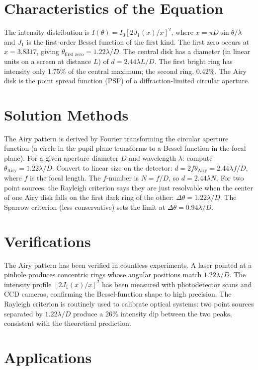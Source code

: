 \section*{Characteristics of the Equation}

The intensity distribution is $I(\theta) = I_0\left[2J_1(x)/x\right]^2$, where $x = \pi D\sin\theta/\lambda$ and $J_1$ is the first-order Bessel function of the first kind. The first zero occurs at $x = 3.8317$, giving $\theta_{\text{first zero}} = 1.22\lambda/D$. The central disk has a diameter (in linear units on a screen at distance $L$) of $d = 2.44\lambda L/D$. The first bright ring has intensity only 1.75\% of the central maximum; the second ring, 0.42\%. The Airy disk is the point spread function (PSF) of a diffraction-limited circular aperture.
\section*{Solution Methods}

The Airy pattern is derived by Fourier transforming the circular aperture function (a circle in the pupil plane transforms to a Bessel function in the focal plane). For a given aperture diameter $D$ and wavelength $\lambda$: compute $\theta_{\text{Airy}} = 1.22\lambda/D$. Convert to linear size on the detector: $d = 2f\theta_{\text{Airy}} = 2.44\lambda f/D$, where $f$ is the focal length. The $f$-number is $N = f/D$, so $d = 2.44\lambda N$. For two point sources, the Rayleigh criterion says they are just resolvable when the center of one Airy disk falls on the first dark ring of the other: $\Delta\theta = 1.22\lambda/D$. The Sparrow criterion (less conservative) sets the limit at $\Delta\theta = 0.94\lambda/D$.
\section*{Verifications}

The Airy pattern has been verified in countless experiments. A laser pointed at a pinhole produces concentric rings whose angular positions match $1.22\lambda/D$. The intensity profile $[2J_1(x)/x]^2$ has been measured with photodetector scans and CCD cameras, confirming the Bessel-function shape to high precision. The Rayleigh criterion is routinely used to calibrate optical systems: two point sources separated by $1.22\lambda/D$ produce a 26\% intensity dip between the two peaks, consistent with the theoretical prediction.
\section*{Applications}

